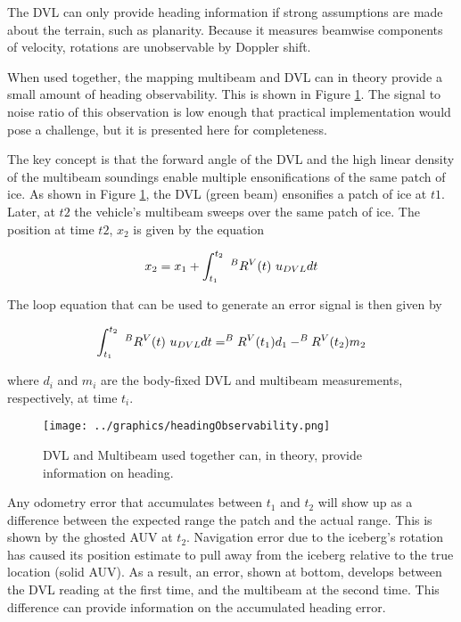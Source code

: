 The DVL can only provide heading information if strong assumptions are made about the terrain, such as planarity. Because it measures beamwise components of velocity, rotations are unobservable by Doppler shift. 

When used together, the mapping multibeam and DVL can in theory provide a small amount of heading observability. This is shown in Figure \ref{fig:headingObservability}. The signal to noise ratio of this observation is low enough that practical implementation would pose a challenge, but it is presented here for completeness.

The key concept is that the forward angle of the DVL and the high linear density of the multibeam soundings  enable multiple ensonifications of the same patch of ice. As shown in Figure \ref{fig:headingObservability}, the DVL (green beam) ensonifies a patch of ice at $t1$. Later, at $t2$ the vehicle's multibeam sweeps over the same patch of ice. The position at time $t2$, $x_2$ is given by the equation

\begin{align}
x_2 = x_1 + \int_{t_1}^{t_2}~^BR^V(t)~u_{\tiny{DVL}}dt
\end{align}

The loop equation that can be used to generate an error signal is then given by

\begin{align}
\int_{t_1}^{t_2}~^BR^V(t)~u_{\tiny{DVL}}dt = ^BR^V(t_1)d_1 -  ^BR^V(t_2)m_2
\end{align}

where $d_i$ and $m_i$ are the body-fixed DVL and multibeam measurements, respectively, at time $t_i$.

\begin{figure}[h]
   \centering
   \texttt{[image: ../graphics/headingObservability.png]} %
   \caption{DVL and Multibeam used together can, in theory, provide information on heading.}
   \label{fig:headingObservability}
\end{figure}

Any odometry error that accumulates between $t_1$ and $t_2$ will show up as a difference between the expected range the patch and the actual range. This is shown by the ghosted AUV at $t_2$. Navigation error due to the iceberg's rotation has caused its position estimate to pull away from the iceberg relative to the true location (solid AUV). As a result, an error, shown at bottom, develops between the DVL reading at the first time, and the multibeam at the second time. This difference can provide information on the accumulated heading error.

